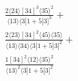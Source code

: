 \documentclass[varwidth, border=5pt]{standalone}
\begin{document}
\begin{my}
$\begin{gathered}
\scriptscriptstyle\frac{2⟨24⟩[34]^3⟨35⟩^2}{⟨13⟩⟨3|1+5|3]^3}+\\
\scriptscriptstyle\frac{2⟨23⟩[34]^2⟨45⟩⟨35⟩}{⟨13⟩⟨34⟩⟨3|1+5|3]^2}+\\
\scriptscriptstyle\frac{1[34]^2⟨12⟩⟨35⟩^2}{⟨13⟩^2⟨3|1+5|3]^2}\phantom{+}
\end{gathered}$
\end{my}
\end{document}
